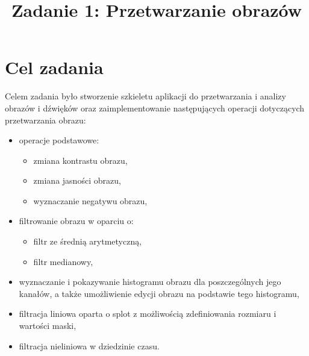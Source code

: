 \documentclass{classrep}
\author{%
  \studentinfo{Michał Janiszewski}{169485} \and
  \studentinfo{Michał Kawski}{169487}
}
\title{Zadanie 1: Przetwarzanie obrazów}
\begin{document}
\maketitle

\section{Cel zadania}
Celem zadania było stworzenie szkieletu aplikacji do przetwarzania i analizy obrazów i dźwięków oraz zaimplementowanie następujących operacji dotyczących przetwarzania obrazu:
\begin{itemize}
 \item operacje podstawowe:
  \begin{itemize}
   \item zmiana kontrastu obrazu,
   \item zmiana jasności obrazu,
   \item wyznaczanie negatywu obrazu,
  \end{itemize}
 \item filtrowanie obrazu w oparciu o:
  \begin{itemize}
   \item filtr ze średnią arytmetyczną,
   \item filtr medianowy,
  \end{itemize}
 \item wyznaczanie i pokazywanie histogramu obrazu dla poszczególnych jego kanałów, a także umożliwienie edycji obrazu na podstawie tego histogramu,
 \item filtracja liniowa oparta o splot z możliwością zdefiniowania rozmiaru i wartości maski,
 \item filtracja nieliniowa w dziedzinie czasu.
\end{itemize}
\end{document}
